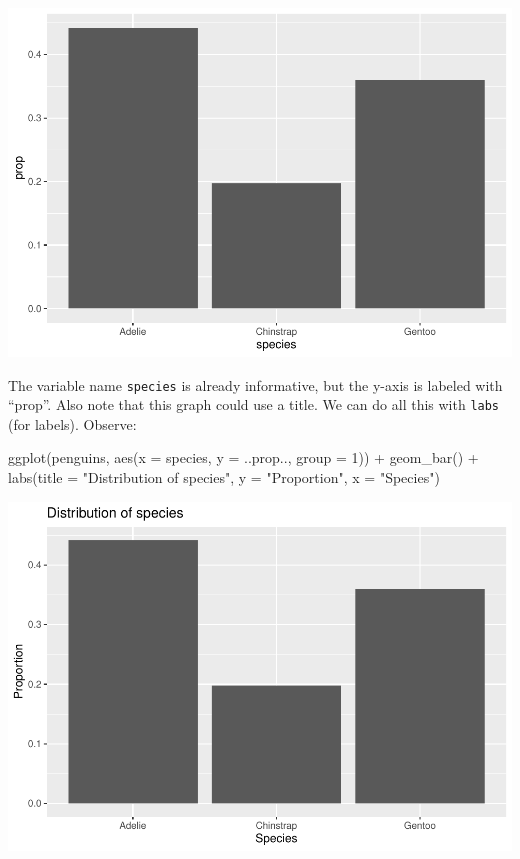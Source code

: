 \documentclass[
]{book}
\newenvironment{Shaded}{\begin{snugshade}}{\end{snugshade}}
\newcommand{\AttributeTok}[1]{\textcolor[rgb]{0.77,0.63,0.00}{#1}}
\newcommand{\DecValTok}[1]{\textcolor[rgb]{0.00,0.00,0.81}{#1}}
\newcommand{\FunctionTok}[1]{\textcolor[rgb]{0.00,0.00,0.00}{#1}}
\newcommand{\NormalTok}[1]{#1}
\newcommand{\SpecialCharTok}[1]{\textcolor[rgb]{0.00,0.00,0.00}{#1}}
\newcommand{\StringTok}[1]{\textcolor[rgb]{0.31,0.60,0.02}{#1}}
\begin{document}
\includegraphics{intro_stats_files/figure-latex/unnamed-chunk-68-1.pdf}

The variable name \texttt{species} is already informative, but the y-axis is labeled with ``prop''. Also note that this graph could use a title. We can do all this with \texttt{labs} (for labels). Observe:

\begin{Shaded}
\begin{Highlighting}[]
\FunctionTok{ggplot}\NormalTok{(penguins, }\FunctionTok{aes}\NormalTok{(}\AttributeTok{x =}\NormalTok{ species, }\AttributeTok{y =}\NormalTok{ ..prop.., }\AttributeTok{group =} \DecValTok{1}\NormalTok{)) }\SpecialCharTok{+}
    \FunctionTok{geom\_bar}\NormalTok{() }\SpecialCharTok{+}
    \FunctionTok{labs}\NormalTok{(}\AttributeTok{title =} \StringTok{"Distribution of species"}\NormalTok{,}
         \AttributeTok{y =} \StringTok{"Proportion"}\NormalTok{,}
         \AttributeTok{x =} \StringTok{"Species"}\NormalTok{)}
\end{Highlighting}
\end{Shaded}

\includegraphics{intro_stats_files/figure-latex/unnamed-chunk-69-1.pdf}
\end{document}
